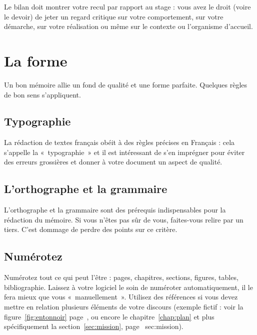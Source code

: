 \documentclass [twoside,openright,a4paper,11pt,french] {report}
\begin{document}
Le bilan doit montrer votre recul par rapport au stage : vous avez
le droit (voire le devoir) de jeter un regard critique sur votre
comportement, sur votre démarche, sur votre réalisation ou même sur
le contexte ou l'organisme d'accueil.



\chapter {La forme}
    \label {chap:contexte}

Un bon mémoire allie un fond de qualité et une forme parfaite. Quelques
règles de bon sens s'appliquent.

\section {Typographie}

La rédaction de textes français obéit à des règles précises en
Français : cela s'appelle la «~typographie~» \cite{andre1990} et il
est intéressant de s'en imprégner pour éviter des erreurs grossières
et donner à votre document un aspect de qualité.

\section {L'orthographe et la grammaire}

L'orthographe et la grammaire sont des prérequis indispensables pour
la rédaction du mémoire. Si vous n'êtes pas sûr de vous, faites-vous
relire par un tiers. C'est dommage de perdre des points sur ce critère.

\section {Numérotez}

Numérotez tout ce qui peut l'être : pages, chapitres, sections, figures,
tables, bibliographie. Laissez à votre logiciel le soin de numéroter
automatiquement, il le fera mieux que vous «~manuellement~». Utilisez
des références si vous devez mettre en relation plusieurs éléments
de votre discours (exemple fictif : voir la figure~\ref {fig:entonnoir}
page~\pageref {fig:entonnoir}, ou encore le chapitre~\ref {chap:plan}
et plus spécifiquement la section~\ref {sec:mission}, page~\pageref
{sec:mission}).
\end{document}
